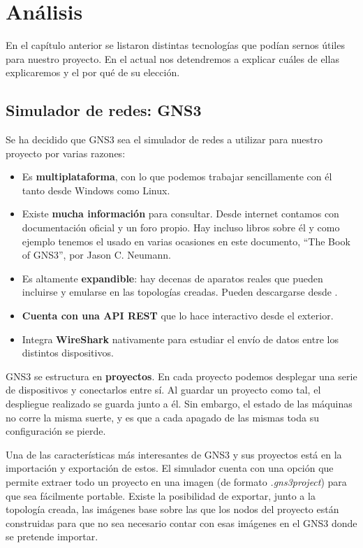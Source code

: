 \chapter{Análisis}\label{chap:Analisis}
En el capítulo anterior se listaron distintas tecnologías que podían sernos útiles para nuestro proyecto. En el actual nos detendremos a explicar cuáles de ellas explicaremos y el por qué de su elección.

\section{Simulador de redes: GNS3}
Se ha decidido que GNS3 sea el simulador de redes a utilizar para nuestro proyecto por varias razones:
\begin{itemize}
\item Es \textbf{multiplataforma}, con lo que podemos trabajar sencillamente con él tanto desde Windows como Linux.
\item Existe \textbf{mucha información} para consultar. Desde internet contamos con documentación oficial y un foro propio. Hay incluso libros sobre él y como ejemplo tenemos el usado en varias ocasiones en este documento, ``The Book of GNS3'', por Jason C. Neumann.
\item Es altamente \textbf{expandible}: hay decenas de aparatos reales que pueden incluirse y emularse en las topologías creadas. Pueden descargarse desde .
\item \textbf{Cuenta con una API REST} que lo hace interactivo desde el exterior.
\item Integra \textbf{WireShark} nativamente para estudiar el envío de datos entre los distintos dispositivos.
\end{itemize}

GNS3 se estructura en \textbf{proyectos}. En cada proyecto podemos desplegar una serie de dispositivos y conectarlos entre sí. Al guardar un proyecto como tal, el despliegue realizado se guarda junto a él. Sin embargo, el estado de las máquinas no corre la misma suerte, y es que a cada apagado de las mismas toda su configuración se pierde.

Una de las características más interesantes de GNS3 y sus proyectos está en la importación y exportación de estos. El simulador cuenta con una opción que permite extraer todo un proyecto en una imagen (de formato \textit{.gns3project}) para que sea fácilmente portable. Existe la posibilidad de exportar, junto a la topología creada, las imágenes base sobre las que los nodos del proyecto están construidas para que no sea necesario contar con esas imágenes en el GNS3 donde se pretende importar.

